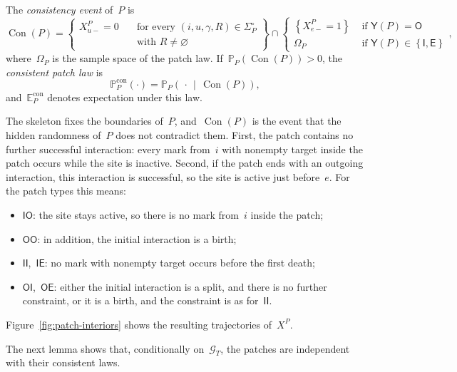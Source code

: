 \documentclass[EJP,preprint,NODS,nobera]{ejpecp}
\newcommand{\pP}{\mathbb{P}}
\newcommand{\E}{\mathbb{E}}
\newcommand{\bb}[1]{\left(#1\right)}
\newcommand{\cb}[1]{\left\{#1\right\}}
\newcommand{\pw}[4]{\left\{\begin{array}{cl}
  #1 &\text{ if } #2 \\
  #3 &\text{ if } #4
\end{array}\right.}
\newcommand{\chg}[1]{{\color{changegreen}#1}}
\begin{document}
\chg{\begin{definition}
\label{def:consistent-patch-law}
The \emph{consistency event} of~$P$ is
\begin{equation*}
\operatorname{Con}(P)
=
\cb{
\begin{aligned}
X_{u-}^P=0
&\quad\text{for every }(i,u,\gamma,R)\in\Sigma_P^\circ\\[-0.2em]
&\quad\text{with }R\neq\varnothing
\end{aligned}
}
\cap
\pw{\cb{X_{e-}^P=1}}{\mathsf Y(P)=\mathsf O}
{\Omega_P}{\mathsf Y(P)\in\cb{\mathsf I,\mathsf E}},
\end{equation*}
where~$\Omega_P$ is the sample space of the patch law.
If~$\pP_P\bb{\operatorname{Con}(P)}>0$, the \emph{consistent patch law} is
\begin{equation*}
\pP_P^{\mathrm{con}}(\cdot)
=
\pP_P\bb{\,\cdot\,\middle|\,\operatorname{Con}(P)},
\end{equation*}
and~$\E_P^{\mathrm{con}}$ denotes expectation under this law.
\end{definition}}

\chg{\begin{remark}
\label{rem:consistency}
The skeleton fixes the boundaries of~$P$, and~$\operatorname{Con}(P)$ is the
event that the hidden randomness of~$P$ does not contradict them. First, the
patch contains no further successful interaction: every mark from~$i$ with
nonempty target inside the patch occurs while the site is inactive. Second, if
the patch ends with an outgoing interaction, this interaction is successful,
so the site is active just before~$e$. For the patch types this means:
\begin{itemize}
\item $\mathsf{IO}$: the site stays active, so there is no mark from~$i$
inside the patch;
\item $\mathsf{OO}$: in addition, the initial interaction is a birth;
\item $\mathsf{II}$,~$\mathsf{IE}$: no mark with nonempty target occurs before
the first death;
\item $\mathsf{OI}$,~$\mathsf{OE}$: either the initial interaction is a split,
and there is no further constraint, or it is a birth, and the constraint is as
for~$\mathsf{II}$.
\end{itemize}
Figure~\ref{fig:patch-interiors} shows the resulting trajectories of~$X^P$.
\end{remark}}

\chg{The next lemma shows that, conditionally on~$\mathcal G_T$, the patches are
independent with their consistent laws.}
\end{document}
